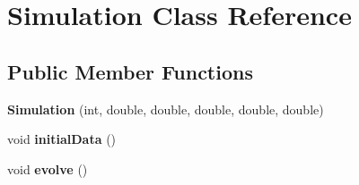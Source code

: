 \hypertarget{class_simulation}{\section{Simulation Class Reference}
\label{class_simulation}
}
\subsection*{Public Member Functions}
\begin{DoxyCompactItemize}
\item 
\hypertarget{class_simulation_a4102cf72a3acc9cea01611f8e8f01748}{{\bfseries Simulation} (int, double, double, double, double, double)}\label{class_simulation_a4102cf72a3acc9cea01611f8e8f01748}

\item 
\hypertarget{class_simulation_a7d647eb2bc557549f39223f8b0abda84}{void {\bfseries initial\-Data} ()}\label{class_simulation_a7d647eb2bc557549f39223f8b0abda84}

\item 
\hypertarget{class_simulation_a0892ba78c1bc7286488761b4fca76c52}{void {\bfseries evolve} ()}\label{class_simulation_a0892ba78c1bc7286488761b4fca76c52}

\end{DoxyCompactItemize}

